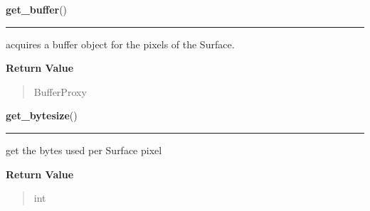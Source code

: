     \vspace{0.5ex}

\hspace{.8\funcindent}\begin{boxedminipage}{\funcwidth}

    \raggedright \textbf{get\_buffer}()

    \vspace{-1.5ex}

    \rule{\textwidth}{0.5\fboxrule}
\setlength{\parskip}{2ex}
    acquires a buffer object for the pixels of the Surface.

\setlength{\parskip}{1ex}
      \textbf{Return Value}
    \vspace{-1ex}

      \begin{quote}
      BufferProxy

      \end{quote}

    \end{boxedminipage}

    \label{pygame:Surface:get_bytesize}

    \vspace{0.5ex}

\hspace{.8\funcindent}\begin{boxedminipage}{\funcwidth}

    \raggedright \textbf{get\_bytesize}()

    \vspace{-1.5ex}

    \rule{\textwidth}{0.5\fboxrule}
\setlength{\parskip}{2ex}
    get the bytes used per Surface pixel

\setlength{\parskip}{1ex}
      \textbf{Return Value}
    \vspace{-1ex}

      \begin{quote}
      int

      \end{quote}

    \end{boxedminipage}

    \label{pygame:Surface:get_clip}

    \vspace{0.5ex}

